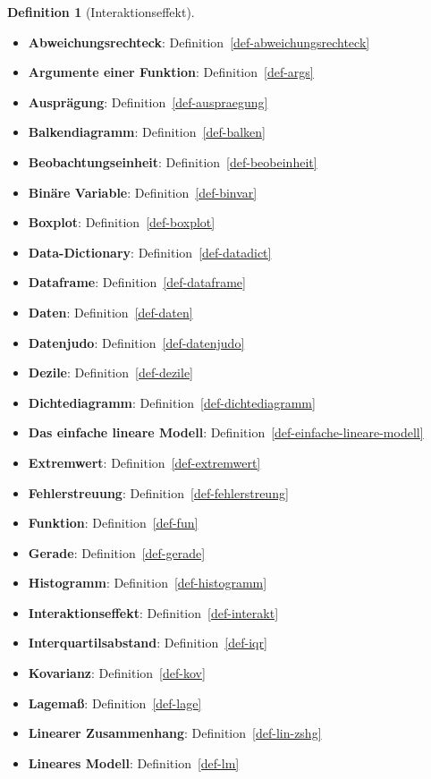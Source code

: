 \documentclass[
  letterpaper,
]{scrbook}
\theoremstyle{definition}
\theoremstyle{definition}
\theoremstyle{definition}
\newtheorem{definition}{Definition}[chapter]
\theoremstyle{remark}
\begin{document}
\begin{definition}[Interaktionseffekt]
\begin{itemize}
\item
  \textbf{Abweichungsrechteck}: Definition~\ref{def-abweichungsrechteck}
\item
  \textbf{Argumente einer Funktion}: Definition~\ref{def-args}
\item
  \textbf{Ausprägung}: Definition~\ref{def-auspraegung}
\item
  \textbf{Balkendiagramm}: Definition~\ref{def-balken}
\item
  \textbf{Beobachtungseinheit}: Definition~\ref{def-beobeinheit}
\item
  \textbf{Binäre Variable}: Definition~\ref{def-binvar}
\item
  \textbf{Boxplot}: Definition~\ref{def-boxplot}
\item
  \textbf{Data-Dictionary}: Definition~\ref{def-datadict}
\item
  \textbf{Dataframe}: Definition~\ref{def-dataframe}
\item
  \textbf{Daten}: Definition~\ref{def-daten}
\item
  \textbf{Datenjudo}: Definition~\ref{def-datenjudo}
\item
  \textbf{Dezile}: Definition~\ref{def-dezile}
\item
  \textbf{Dichtediagramm}: Definition~\ref{def-dichtediagramm}
\item
  \textbf{Das einfache lineare Modell}:
  Definition~\ref{def-einfache-lineare-modell}
\item
  \textbf{Extremwert}: Definition~\ref{def-extremwert}
\item
  \textbf{Fehlerstreuung}: Definition~\ref{def-fehlerstreung}
\item
  \textbf{Funktion}: Definition~\ref{def-fun}
\item
  \textbf{Gerade}: Definition~\ref{def-gerade}
\item
  \textbf{Histogramm}: Definition~\ref{def-histogramm}
\item
  \textbf{Interaktionseffekt}: Definition~\ref{def-interakt}
\item
  \textbf{Interquartilsabstand}: Definition~\ref{def-iqr}
\item
  \textbf{Kovarianz}: Definition~\ref{def-kov}
\item
  \textbf{Lagemaß}: Definition~\ref{def-lage}
\item
  \textbf{Linearer Zusammenhang}: Definition~\ref{def-lin-zshg}
\item
  \textbf{Lineares Modell}: Definition~\ref{def-lm}

\end{itemize}
\end{definition}
\end{document}

